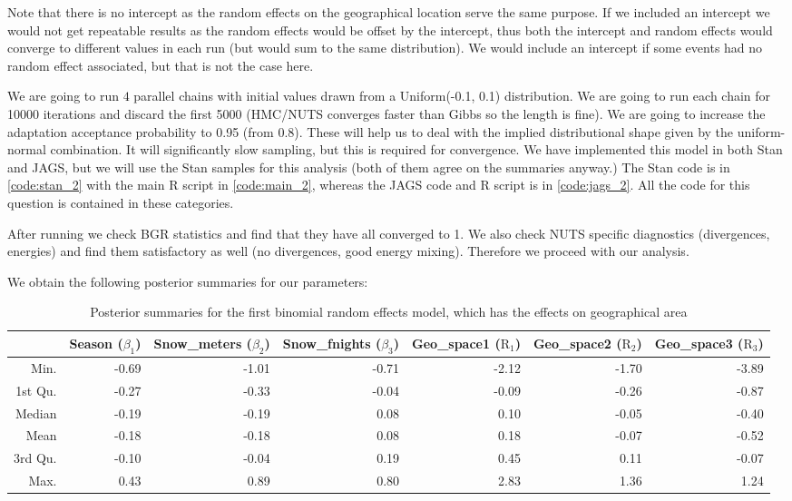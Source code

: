 \documentclass[12pt]{extarticle}
\begin{document}
Note that there is no intercept as the random effects on the geographical location serve the same purpose. If we included an intercept we would not get repeatable results as the random effects would be offset by the intercept, thus both the intercept and random effects would converge to different values in each run (but would sum to the same distribution). We would include an intercept if some events had no random effect associated, but that is not the case here.

We are going to run $4$ parallel chains with initial values drawn from a Uniform(-0.1, 0.1) distribution. We are going to run each chain for 10000 iterations and discard the first 5000 (HMC/NUTS converges faster than Gibbs so the length is fine). We are going to increase the adaptation acceptance probability to 0.95 (from 0.8). These will help us to deal with the implied distributional shape given by the uniform-normal combination. It will significantly slow sampling, but this is required for convergence. We have implemented this model in both Stan and JAGS, but we will use the Stan samples for this analysis (both of them agree on the summaries anyway.) The Stan code is in \ref{code:stan_2} with the main R script in \ref{code:main_2}, whereas the JAGS code and R script is in \ref{code:jags_2}. All the code for this question is contained in these categories.

After running we check BGR statistics and find that they have all converged to 1. We also check NUTS specific diagnostics (divergences, energies) and find them satisfactory as well (no divergences, good energy mixing). Therefore we proceed with our analysis.

We obtain the following posterior summaries for our parameters:

\begin{table}[ht]
	\centering
	\tiny
	\begin{tabular}{r|rrrrrr}
		\hline
		& Season ($\beta_1$) & Snow\_meters ($\beta_2$) & Snow\_fnights ($\beta_3$) & Geo\_space1 ($\mathrm{R}_{1}$) & Geo\_space2 ($\mathrm{R}_{2}$) & Geo\_space3 ($\mathrm{R}_{3}$)\\ 
		\hline
		Min. & -0.69 & -1.01 & -0.71 & -2.12 & -1.70 & -3.89 \\ 
		1st Qu. & -0.27 & -0.33 & -0.04 & -0.09 & -0.26 & -0.87 \\ 
		Median & -0.19 & -0.19 & 0.08 & 0.10 & -0.05 & -0.40 \\ 
		Mean & -0.18 & -0.18 & 0.08 & 0.18 & -0.07 & -0.52 \\ 
		3rd Qu. & -0.10 & -0.04 & 0.19 & 0.45 & 0.11 & -0.07 \\ 
		Max. & 0.43 & 0.89 & 0.80 & 2.83 & 1.36 & 1.24 \\ 
		\hline
	\end{tabular}
\caption{Posterior summaries for the first binomial random effects model, which has the effects on geographical area}
\label{tab:postsum_binmod1}
\end{table}
\end{document}
